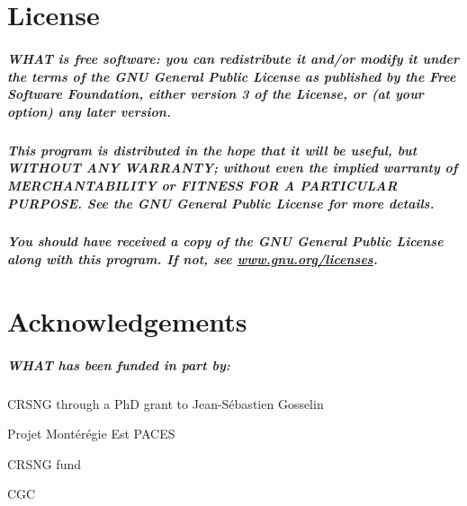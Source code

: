 \documentclass[10pt, letterpaper, fleqn]{report}
\begin{document}
\chapter*{License}

\paragraph{WHAT is free software: you can redistribute it and/or modify it under the terms of the GNU General Public License as published by the Free Software Foundation, either version 3 of the License, or (at your option) any later version.}
\paragraph{This program is distributed in the hope that it will be useful, but WITHOUT ANY WARRANTY; without even the implied warranty of MERCHANTABILITY or FITNESS FOR A PARTICULAR PURPOSE. See the GNU General Public License for more details.}
\paragraph{You should have received a copy of the GNU General Public License along with this program. If not, see \url{www.gnu.org/licenses}.}

\newpage

\chapter*{Acknowledgements}

\paragraph{WHAT has been funded in part by:}
\begin{description}
\item{CRSNG through a PhD grant to Jean-Sébastien Gosselin}
\item{Projet Montérégie Est PACES}
\item{CRSNG fund}
\item{CGC}
\end{description}
\end{document}
